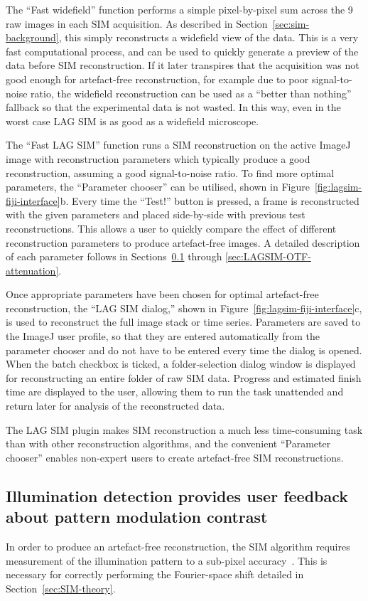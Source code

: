 The ``Fast widefield'' function performs a simple pixel-by-pixel sum across the 9 raw images in each SIM acquisition.
As described in Section~\ref{sec:sim-background}, this simply reconstructs a widefield view of the data.
This is a very fast computational process, and can be used to quickly generate a preview of the data before SIM reconstruction.
If it later transpires that the acquisition was not good enough for artefact-free reconstruction, for example due to poor signal-to-noise ratio, the widefield reconstruction can be used as a ``better than nothing'' fallback so that the experimental data is not wasted.
In this way, even in the worst case LAG SIM is as good as a widefield microscope.

The ``Fast LAG SIM'' function runs a SIM reconstruction on the active ImageJ image with reconstruction parameters which typically produce a good reconstruction, assuming a good signal-to-noise ratio.
To find more optimal parameters, the ``Parameter chooser'' can be utilised, shown in Figure~\ref{fig:lagsim-fiji-interface}b.
Every time the ``Test!'' button is pressed, a frame is reconstructed with the given parameters and placed side-by-side with previous test reconstructions.
This allows a user to quickly compare the effect of different reconstruction parameters to produce artefact-free images.
A detailed description of each parameter follows in Sections~\ref{sec:LAGSIM-illumination-detection} through \ref{sec:LAGSIM-OTF-attenuation}.

Once appropriate parameters have been chosen for optimal artefact-free reconstruction, the ``LAG SIM dialog,'' shown in Figure~\ref{fig:lagsim-fiji-interface}c, is used to reconstruct the full image stack or time series.
Parameters are saved to the ImageJ user profile, so that they are entered automatically from the parameter chooser and do not have to be entered every time the dialog is opened.
When the batch checkbox is ticked, a folder-selection dialog window is displayed for reconstructing an entire folder of raw SIM data.
Progress and estimated finish time are displayed to the user, allowing them to run the task unattended and return later for analysis of the reconstructed data.

The LAG SIM plugin makes SIM reconstruction a much less time-consuming task than with other reconstruction algorithms, and the convenient ``Parameter chooser'' enables non-expert users to create artefact-free SIM reconstructions.


\subsection{\sloppy Illumination detection provides user feedback about pattern modulation contrast}\label{sec:LAGSIM-illumination-detection}
In order to produce an artefact-free reconstruction, the SIM algorithm requires measurement of the illumination pattern to a sub-pixel accuracy~\cite{muller2016open}.
This is necessary for correctly performing the Fourier-space shift detailed in Section~\ref{sec:SIM-theory}.

